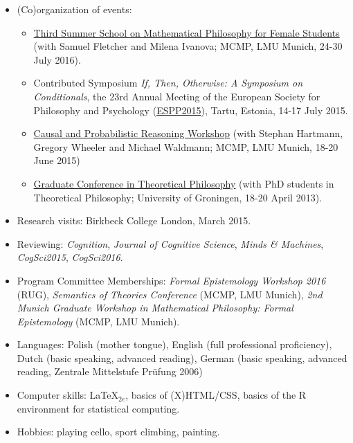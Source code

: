 \documentclass[a4paper,12pt]{article}
\begin{document}
\begin{small}
  \begin{itemize}
  	\item (Co)organization of events:
  		\begin{itemize}
		  \item \href{http://www.mathsummer.philosophie.uni-muenchen.de}{Third Summer School on Mathematical Philosophy for Female Students} (with Samuel Fletcher and Milena Ivanova; MCMP, LMU Munich, 24-30 July 2016).
		  \item Contributed Symposium \emph{If, Then, Otherwise: A Symposium on Conditionals}, the 23rd Annual Meeting of the European Society for Philosophy and Psychology (\href{http://espp2015.ut.ee}{ESPP2015}), Tartu, Estonia, 14-17 July 2015.
		  \item \href{http://lmu.de/cpr2015}{Causal and Probabilistic Reasoning Workshop} (with Stephan Hartmann, Gregory Wheeler and Michael Waldmann; MCMP, LMU Munich, 18-20 June 2015)
		  \item  \href{http://www.philos.rug.nl/GCTP2013/}{Graduate Conference in
	      Theoretical Philosophy} (with PhD students in Theoretical Philosophy; University of Groningen, 18-20 April 2013).
  		\end{itemize}
  	\item Research visits: Birkbeck College London, March 2015.

    \item Reviewing: \emph{Cognition}, \emph{Journal of Cognitive Science}, \emph{Minds \& Machines}, \emph{CogSci2015}, \emph{CogSci2016}.
    
    \item Program Committee Memberships: \emph{Formal Epistemology Workshop 2016} (RUG), \emph{Semantics of Theories Conference} (MCMP, LMU Munich), \emph{2nd Munich Graduate Workshop in Mathematical Philosophy: Formal Epistemology} (MCMP, LMU Munich).
  \end{itemize}


  \begin{itemize}
  \item Languages: Polish (mother tongue), English (full professional proficiency), Dutch
    (basic speaking, advanced reading), German (basic speaking, advanced reading, Zentrale
    Mittelstufe Pr\"ufung 2006)
  \item Computer skills: \LaTeX$_{2e}$, basics of
    (X)HTML/CSS, basics of the R environment for statistical
    computing.

  \item Hobbies: playing cello, sport climbing, painting.
  \end{itemize}


\end{small}
\end{document}
